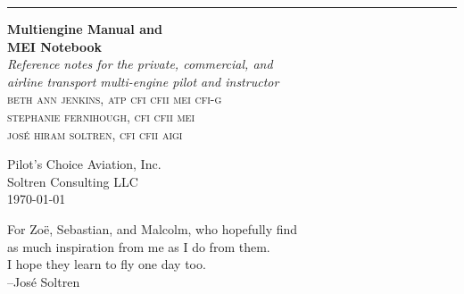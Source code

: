 \documentclass[11pt,twoside,letterpaper,onecolumn]{book}
\newenvironment{dedication}
  {\clearpage           %
   \thispagestyle{empty}%
   \vspace*{\stretch{1}}%
   \itshape             %
   \raggedleft          %
  }
  {\par %
   \vspace{\stretch{3}} %
   \clearpage           %
  }
\begin{document}
\begin{titlepage} %
\raggedleft %
\rule{1pt}{\textheight} %
\hspace{0.05\textwidth} %
\parbox[b]{0.75\textwidth}{ %
{\Huge\bfseries Multiengine Manual and\\MEI Notebook}\\[2\baselineskip] %
{\large\textit{Reference notes for the private, commercial, and \\
    airline transport multi-engine pilot and instructor}}\\[4\baselineskip] %
{\Large\textsc{beth ann jenkins, atp cfi cfii mei cfi-g\\}} %
{\Large\textsc{stephanie fernihough, cfi cfii mei\\}} %
{\Large\textsc{jos\'e hiram soltren, cfi cfii aigi}} %

\vspace{0.5\textheight} %

{\noindent Pilot's Choice Aviation, Inc.\\Soltren Consulting LLC}\\[\baselineskip] %
{\noindent \today }\\[\baselineskip] %
}

\end{titlepage}

\begin{dedication}
For Zo\"e, Sebastian, and Malcolm, who hopefully find\\
as much inspiration from me as I do from them.\\
I hope they learn to fly one day too.\\
--Jos\'e Soltren
\end{dedication}

\pagestyle{fancy}

\fancyhead{} %
\fancyfoot{} %
\fancyfoot[LE,RO]{\thepage}
\fancyfoot[LO,CE]{}
\fancyfoot[CO,RE]{}



%
%

\tableofcontents



\printbibliography
\end{document}
